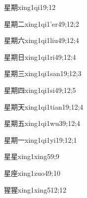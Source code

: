 \begin{verbete}{星期}{xing1qi1}{9;12}
\end{verbete}

\begin{verbete}{星期二}{xing1qi1'er4}{9;12;2}
\end{verbete}

\begin{verbete}{星期六}{xing1qi1liu4}{9;12;4}
\end{verbete}

\begin{verbete}{星期日}{xing1qi1ri4}{9;12;4}
\end{verbete}

\begin{verbete}{星期三}{xing1qi1san1}{9;12;3}
\end{verbete}

\begin{verbete}{星期四}{xing1qi1si4}{9;12;5}
\end{verbete}

\begin{verbete}{星期天}{xing1qi1tian1}{9;12;4}
\end{verbete}

\begin{verbete}{星期五}{xing1qi1wu3}{9;12;4}
\end{verbete}

\begin{verbete}{星期一}{xing1qi1yi1}{9;12;1}
\end{verbete}

\begin{verbete}{星星}{xing1xing5}{9;9}
\end{verbete}

\begin{verbete}{星座}{xing1zuo4}{9;10}
\end{verbete}

\begin{verbete}{猩猩}{xing1xing5}{12;12}
\end{verbete}

